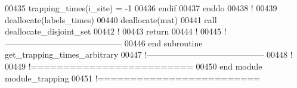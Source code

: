 \begin{DoxyCode}
00435           trapping\_times(i\_site) = -1
00436        \textcolor{keyword}{endif}
00437     \textcolor{keyword}{enddo}
00438     \textcolor{comment}{!}
00439     \textcolor{keyword}{deallocate}(labels\_times)
00440     \textcolor{keyword}{deallocate}(mat)
00441     call deallocate\_disjoint\_set
00442     \textcolor{comment}{!}
00443     return
00444     \textcolor{comment}{!}
00445   \textcolor{comment}{!------------------------------------------}
00446 \textcolor{keyword}{  end subroutine get\_trapping\_times\_arbitrary}
00447   \textcolor{comment}{!------------------------------------------}
00448   \textcolor{comment}{!}
00449 \textcolor{comment}{!=========================}
00450 \textcolor{keyword}{end module module\_trapping}
00451 \textcolor{comment}{!=========================}
\end{DoxyCode}
